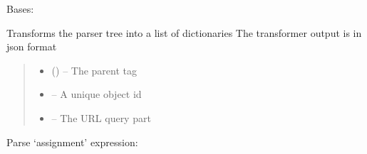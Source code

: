 \documentclass[letterpaper,10pt,english]{sphinxmanual}
\begin{document}
\begin{savenotes}\begin{fulllineitems}
\label{\detokenize{eezz:eezz.service.TServiceCompiler}}
\pysigstartsignatures
{}
\pysigstopsignatures
\sphinxAtStartPar
Bases: 

\sphinxAtStartPar
Transforms the parser tree into a list of dictionaries
The transformer output is in json format
\begin{quote}\begin{description}
\begin{itemize}
\item {} 
\sphinxAtStartPar
{} () – The parent tag

\item {} 
\sphinxAtStartPar
{} – A unique object id

\item {} 
\sphinxAtStartPar
{} – The URL query part

\end{itemize}

\end{description}\end{quote}

\begin{savenotes}\begin{fulllineitems}
\label{\detokenize{eezz:eezz.service.TServiceCompiler.assignment}}
\pysigstartsignatures
{}
\pysigstopsignatures
\sphinxAtStartPar
Parse ‘assignment’ expression: 


\end{fulllineitems}
\end{savenotes}
\end{fulllineitems}
\end{savenotes}
\end{document}
